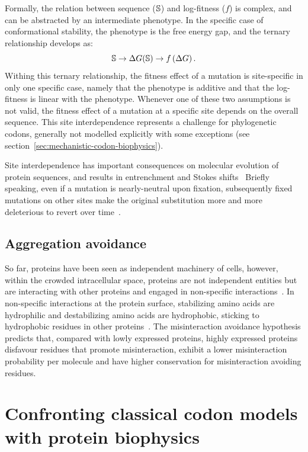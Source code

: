 Formally, the relation between sequence ($\mathbb{S}$) and log-fitness ($f$) is complex, and can be abstracted by an intermediate phenotype.
In the specific case of conformational stability, the phenotype is the free energy gap, and the ternary relationship develops as:
\begin{equation}
    \mathbb{S} \rightarrow \Delta G (\mathbb{S}) \rightarrow f \left( \Delta G \right).
\end{equation}
Withing this ternary relationship, the fitness effect of a mutation is site-specific in only one specific case, namely that the phenotype is additive and that the log-fitness is linear with the phenotype.
Whenever one of these two assumptions is not valid, the fitness effect of a mutation at a specific site depends on the overall sequence.
This site interdependence represents a challenge for phylogenetic codons, generally not modelled explicitly with some exceptions (see section~\ref{sec:mechanistic-codon-biophysics}).

Site interdependence has important consequences on molecular evolution  of protein sequences, and results in entrenchment and Stokes shifts~\citep{Pollock2012, Shah2015}
Briefly speaking, even if a mutation is nearly-neutral upon fixation, subsequently fixed mutations on other sites make the original substitution more and more deleterious to revert over time~\citep{Lunzer2010, Naumenko2012, Mccandlish2013}.

\subsection{Aggregation avoidance}

So far, proteins have been seen as independent machinery of cells, however, within the crowded intracellular space, proteins are not independent entities but are interacting with other proteins and engaged in non-specific interactions~\citep{Yang2012, Zhang2013}.
In non-specific interactions at the protein surface, stabilizing amino acids are hydrophilic and destabilizing amino acids are hydrophobic, sticking to hydrophobic residues in other proteins~\citep{Dixit2013,Manhart2015}.
The misinteraction avoidance hypothesis predicts that, compared with lowly expressed proteins, highly expressed proteins disfavour residues that promote misinteraction, exhibit a lower misinteraction probability per molecule and have higher conservation for misinteraction avoiding residues.

\section{Confronting classical codon models with protein biophysics}
\label{sec:classical-codon-biophysics}

